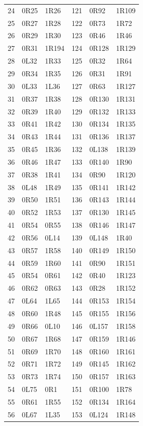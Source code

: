 \begin{longtable}{rll@{\qquad}rll}
24 & 0R25 & 1R26 & 121 & 0R92 & 1R109\\
25 & 0R27 & 1R28 & 122 & 0R73 & 1R72\\
26 & 0R29 & 1R30 & 123 & 0R46 & 1R46\\
27 & 0R31 & 1R194 & 124 & 0R128 & 1R129\\
28 & 0L32 & 1R33 & 125 & 0R32 & 1R64\\
29 & 0R34 & 1R35 & 126 & 0R31 & 1R91\\
30 & 0L33 & 1L36 & 127 & 0R63 & 1R127\\
31 & 0R37 & 1R38 & 128 & 0R130 & 1R131\\
32 & 0R39 & 1R40 & 129 & 0R132 & 1R133\\
33 & 0R41 & 1R42 & 130 & 0R134 & 1R135\\
34 & 0R43 & 1R44 & 131 & 0R136 & 1R137\\
35 & 0R45 & 1R36 & 132 & 0L138 & 1R139\\
36 & 0R46 & 1R47 & 133 & 0R140 & 1R90\\
37 & 0R38 & 1R41 & 134 & 0R90 & 1R120\\
38 & 0L48 & 1R49 & 135 & 0R141 & 1R142\\
39 & 0R50 & 1R51 & 136 & 0R143 & 1R144\\
40 & 0R52 & 1R53 & 137 & 0R130 & 1R145\\
41 & 0R54 & 0R55 & 138 & 0R146 & 1R147\\
42 & 0R56 & 0L14 & 139 & 0L148 & 1R40\\
43 & 0R57 & 1R58 & 140 & 0R149 & 1R150\\
44 & 0R59 & 1R60 & 141 & 0R90 & 1R151\\
45 & 0R54 & 0R61 & 142 & 0R40 & 1R123\\
46 & 0R62 & 0R63 & 143 & 0R28 & 1R152\\
47 & 0L64 & 1L65 & 144 & 0R153 & 1R154\\
48 & 0R60 & 1R48 & 145 & 0R155 & 1R156\\
49 & 0R66 & 0L10 & 146 & 0L157 & 1R158\\
50 & 0R67 & 1R68 & 147 & 0R159 & 1R146\\
51 & 0R69 & 1R70 & 148 & 0R160 & 1R161\\
52 & 0R71 & 1R72 & 149 & 0R145 & 1R162\\
53 & 0R73 & 1R74 & 150 & 0R157 & 1R163\\
54 & 0L75 & 0R1 & 151 & 0R100 & 1R78\\
55 & 0R61 & 1R55 & 152 & 0R134 & 1R164\\
56 & 0L67 & 1L35 & 153 & 0L124 & 1R148\\

\end{longtable}
